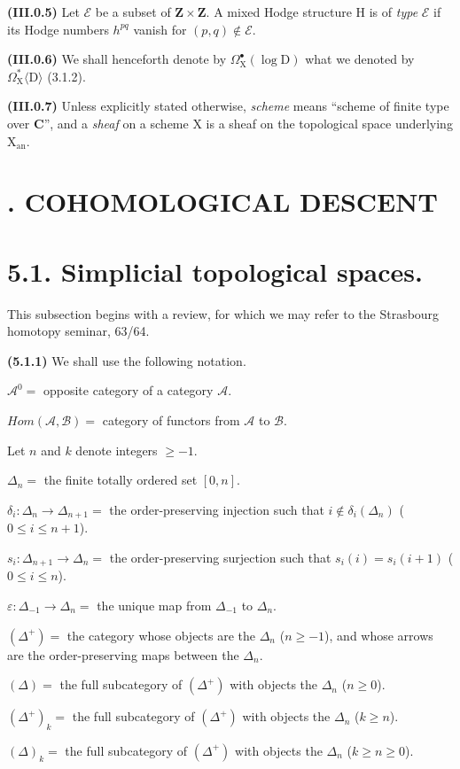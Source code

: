 \documentclass[11pt,leqno]{article}
\begin{document}
\textbf{(III.0.5)} Let \(\mathscr{E}\) be a subset of \(\mathbf{Z}\times\mathbf{Z}\). A mixed Hodge structure \(\mathrm{H}\) is of \textit{type} \(\mathscr{E}\) if its Hodge numbers \(h^{pq}\) vanish for \((p,q)\notin\mathscr{E}\).

\textbf{(III.0.6)} We shall henceforth denote by \(\Omega_{\mathrm{X}}^{\bullet}(\log\mathrm{D})\) what we denoted by \(\Omega_{\mathrm{X}}^*\langle\mathrm{D}\rangle\) (3.1.2).

\textbf{(III.0.7)} Unless explicitly stated otherwise, \textit{scheme} means “scheme of finite type over \(\mathbf{C}\)”, and a \textit{sheaf} on a scheme \(\mathrm{X}\) is a sheaf on the topological space underlying \(\mathrm{X}_{\mathrm{an}}\).

\section*{. COHOMOLOGICAL DESCENT}

\section*{5.1. Simplicial topological spaces.}

This subsection begins with a review, for which we may refer to the Strasbourg homotopy seminar, 63/64.

\textbf{(5.1.1)} We shall use the following notation.

\noindent \(\mathscr{A}^{0}=\) opposite category of a category \(\mathscr{A}\).\par
\noindent \(\mathit{Hom}(\mathscr{A},\mathscr{B})=\) category of functors from \(\mathscr{A}\) to \(\mathscr{B}\).\par

Let \(n\) and \(k\) denote integers \(\geq-1\).

\noindent \(\Delta_n=\) the finite totally ordered set \([0,n]\).\par
\noindent \(\delta_i:\Delta_n\to\Delta_{n+1}=\) the order-preserving injection such that \(i\notin\delta_i(\Delta_n)\) (\(0\leq i\leq n+1\)).\par
\noindent \(s_i:\Delta_{n+1}\to\Delta_n=\) the order-preserving surjection such that \(s_i(i)=s_i(i+1)\) (\(0\leq i\leq n\)).\par
\noindent \(\varepsilon:\Delta_{-1}\to\Delta_n=\) the unique map from \(\Delta_{-1}\) to \(\Delta_n\).\par
\noindent \((\Delta^+)=\) the category whose objects are the \(\Delta_n\) (\(n\geq-1\)), and whose arrows are the order-preserving maps between the \(\Delta_n\).\par
\noindent \((\Delta)=\) the full subcategory of \((\Delta^+)\) with objects the \(\Delta_n\) (\(n\geq0\)).\par
\noindent \((\Delta^+)_k=\) the full subcategory of \((\Delta^+)\) with objects the \(\Delta_n\) (\(k\geq n\)).\par
\noindent \((\Delta)_k=\) the full subcategory of \((\Delta^+)\) with objects the \(\Delta_n\) (\(k\geq n\geq0\)).\par
\end{document}
